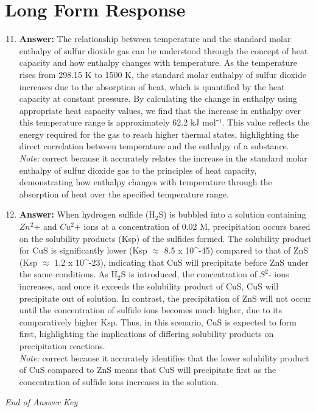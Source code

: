 \documentclass[12pt]{article}
\begin{document}
\section*{Long Form Response}
\begin{enumerate}[label=\arabic*.]
\setcounter{enumi}{10}
\item \textbf{Answer:} The relationship between temperature and the standard molar enthalpy of sulfur dioxide gas can be understood through the concept of heat capacity and how enthalpy changes with temperature. As the temperature rises from 298.15 K to 1500 K, the standard molar enthalpy of sulfur dioxide increases due to the absorption of heat, which is quantified by the heat capacity at constant pressure. By calculating the change in enthalpy using appropriate heat capacity values, we find that the increase in enthalpy over this temperature range is approximately 62.2 kJ mol⁻¹. This value reflects the energy required for the gas to reach higher thermal states, highlighting the direct correlation between temperature and the enthalpy of a substance.
\\ \textit{Note:} correct because it accurately relates the increase in the standard molar enthalpy of sulfur dioxide gas to the principles of heat capacity, demonstrating how enthalpy changes with temperature through the absorption of heat over the specified temperature range.
\item \textbf{Answer:} When hydrogen sulfide (H$_{2}$S) is bubbled into a solution containing $Zn^2$+ and $Cu^2$+ ions at a concentration of 0.02 M, precipitation occurs based on the solubility products (Ksp) of the sulfides formed. The solubility product for CuS is significantly lower (Ksp \ensuremath{\approx} 8.5 x 10^-45) compared to that of ZnS (Ksp \ensuremath{\approx} 1.2 x 10^-23), indicating that CuS will precipitate before ZnS under the same conditions. As H$_{2}$S is introduced, the concentration of $S^2$- ions increases, and once it exceeds the solubility product of CuS, CuS will precipitate out of solution. In contrast, the precipitation of ZnS will not occur until the concentration of sulfide ions becomes much higher, due to its comparatively higher Ksp. Thus, in this scenario, CuS is expected to form first, highlighting the implications of differing solubility products on precipitation reactions.
\\ \textit{Note:} correct because it accurately identifies that the lower solubility product of CuS compared to ZnS means that CuS will precipitate first as the concentration of sulfide ions increases in the solution.
\end{enumerate}

\vfill
\noindent\textit{End of Answer Key}
\end{document}
